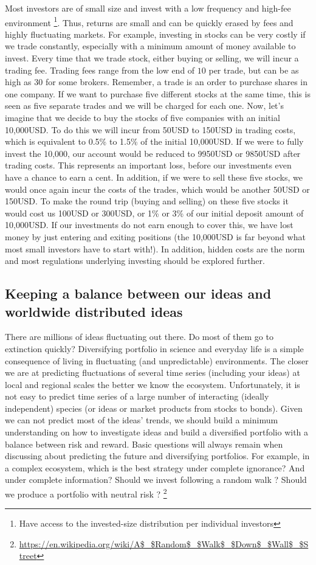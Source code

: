 \documentclass[english,12pt]{article}
\begin{document}
Most investors are of small size and invest with a low frequency and
high-fee environment \footnote{Have access to the invested-size
  distribution per individual investors}. Thus, returns are small and
can be quickly erased by fees and highly fluctuating markets. For
example, investing in stocks can be very costly if we trade
constantly, especially with a minimum amount of money available to
invest. Every time that we trade stock, either buying or selling, we
will incur a trading fee. Trading fees range from the low end of $10$
per trade, but can be as high as $30$ for some brokers. Remember, a
trade is an order to purchase shares in one company. If we want to
purchase five different stocks at the same time, this is seen as five
separate trades and we will be charged for each one. Now, let's
imagine that we decide to buy the stocks of five companies with an
initial 10,000USD. To do this we will incur from 50USD to 150USD in
trading costs, which is equivalent to 0.5\% to 1.5\% of the initial
10,000USD. If we were to fully invest the 10,000, our account would be
reduced to 9950USD or 9850USD after trading costs. This represents an
important loss, before our investments even have a chance to earn a
cent. In addition, if we were to sell these five stocks, we would once
again incur the costs of the trades, which would be another 50USD or
150USD. To make the round trip (buying and selling) on these five
stocks it would cost us 100USD or 300USD, or 1\% or 3\% of our initial
deposit amount of 10,000USD. If our investments do not earn enough to
cover this, we have lost money by just entering and exiting positions
(the 10,000USD is far beyond what most small investors have to start
with!). In addition, hidden costs are the norm and most regulations
underlying investing should be explored further. 

\subsection{Keeping a balance between our ideas and worldwide distributed ideas}

There are millions of ideas fluctuating out there. Do most of them go
to extinction quickly? Diversifying portfolio in science and everyday
life is a simple consequence of living in fluctuating (and
unpredictable) environments. The closer we are at predicting
fluctuations of several time series (including your ideas) at local
and regional scales the better we know the ecosystem. Unfortunately,
it is not easy to predict time series of a large number of interacting
(ideally independent) species (or ideas or market products from stocks
to bonds). Given we can not predict most of the ideas' trends, we
should build a minimum understanding on how to investigate ideas and
build a diversified portfolio with a balance between risk and
reward. Basic questions will always remain when discussing about
predicting the future and diversifying portfolios. For example, in a
complex ecosystem, which is the best strategy under complete
ignorance? And under complete information? Should we invest following
a random walk ? Should we produce a portfolio with neutral risk
?
\footnote{\url{https://en.wikipedia.org/wiki/A$_$Random$_$Walk$_$Down$_$Wall$_$Street}}
\end{document}
